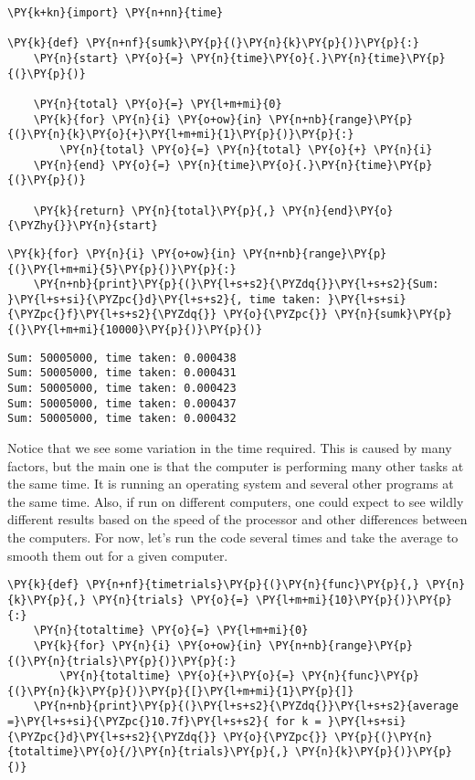 \begin{Verbatim}[commandchars=\\\{\}]
\PY{k+kn}{import} \PY{n+nn}{time}

\PY{k}{def} \PY{n+nf}{sumk}\PY{p}{(}\PY{n}{k}\PY{p}{)}\PY{p}{:}
    \PY{n}{start} \PY{o}{=} \PY{n}{time}\PY{o}{.}\PY{n}{time}\PY{p}{(}\PY{p}{)}

    \PY{n}{total} \PY{o}{=} \PY{l+m+mi}{0}
    \PY{k}{for} \PY{n}{i} \PY{o+ow}{in} \PY{n+nb}{range}\PY{p}{(}\PY{n}{k}\PY{o}{+}\PY{l+m+mi}{1}\PY{p}{)}\PY{p}{:}
        \PY{n}{total} \PY{o}{=} \PY{n}{total} \PY{o}{+} \PY{n}{i}
    \PY{n}{end} \PY{o}{=} \PY{n}{time}\PY{o}{.}\PY{n}{time}\PY{p}{(}\PY{p}{)}

    \PY{k}{return} \PY{n}{total}\PY{p}{,} \PY{n}{end}\PY{o}{\PYZhy{}}\PY{n}{start}
\end{Verbatim}



\begin{Verbatim}[commandchars=\\\{\}]
\PY{k}{for} \PY{n}{i} \PY{o+ow}{in} \PY{n+nb}{range}\PY{p}{(}\PY{l+m+mi}{5}\PY{p}{)}\PY{p}{:}
    \PY{n+nb}{print}\PY{p}{(}\PY{l+s+s2}{\PYZdq{}}\PY{l+s+s2}{Sum: }\PY{l+s+si}{\PYZpc{}d}\PY{l+s+s2}{, time taken: }\PY{l+s+si}{\PYZpc{}f}\PY{l+s+s2}{\PYZdq{}} \PY{o}{\PYZpc{}} \PY{n}{sumk}\PY{p}{(}\PY{l+m+mi}{10000}\PY{p}{)}\PY{p}{)}
\end{Verbatim}

\begin{Verbatim}
Sum: 50005000, time taken: 0.000438
Sum: 50005000, time taken: 0.000431
Sum: 50005000, time taken: 0.000423
Sum: 50005000, time taken: 0.000437
Sum: 50005000, time taken: 0.000432

\end{Verbatim}


Notice that we see some variation in the time required.
This is caused by many factors, but the main one is that the computer is performing many other tasks at the same time.
It is running an operating system and several other programs at the same time.
Also, if run on different computers, one could expect to see wildly different results based on the speed of the processor and other differences between the computers.
For now, let's run the code several times and take the average to smooth them out for a given computer.

\begin{Verbatim}[commandchars=\\\{\}]
\PY{k}{def} \PY{n+nf}{timetrials}\PY{p}{(}\PY{n}{func}\PY{p}{,} \PY{n}{k}\PY{p}{,} \PY{n}{trials} \PY{o}{=} \PY{l+m+mi}{10}\PY{p}{)}\PY{p}{:}
    \PY{n}{totaltime} \PY{o}{=} \PY{l+m+mi}{0}
    \PY{k}{for} \PY{n}{i} \PY{o+ow}{in} \PY{n+nb}{range}\PY{p}{(}\PY{n}{trials}\PY{p}{)}\PY{p}{:}
        \PY{n}{totaltime} \PY{o}{+}\PY{o}{=} \PY{n}{func}\PY{p}{(}\PY{n}{k}\PY{p}{)}\PY{p}{[}\PY{l+m+mi}{1}\PY{p}{]}
    \PY{n+nb}{print}\PY{p}{(}\PY{l+s+s2}{\PYZdq{}}\PY{l+s+s2}{average =}\PY{l+s+si}{\PYZpc{}10.7f}\PY{l+s+s2}{ for k = }\PY{l+s+si}{\PYZpc{}d}\PY{l+s+s2}{\PYZdq{}} \PY{o}{\PYZpc{}} \PY{p}{(}\PY{n}{totaltime}\PY{o}{/}\PY{n}{trials}\PY{p}{,} \PY{n}{k}\PY{p}{)}\PY{p}{)}
\end{Verbatim}



